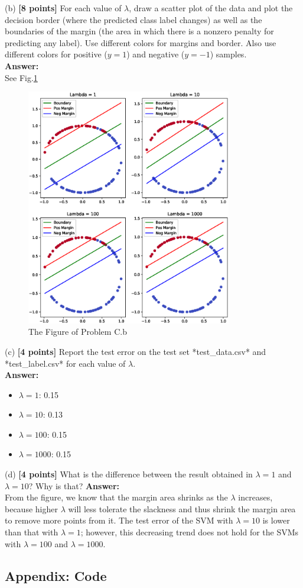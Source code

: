 (b) \textbf{[8 points]} For each value of $\lambda$, draw a scatter plot of the data and plot the decision border  (where
the predicted class label changes) as well as the boundaries of the margin (the area in which
there is a nonzero penalty for predicting any label). Use different colors for margins and border. Also use different colors for positive ($y=1$) and negative ($y=-1$) samples.\\
\textbf{Answer:}\\
See Fig.\ref{fig:svm}
\begin{figure}[!h]
	\centering
	\includegraphics[width=0.8\textwidth]{./img/svm.eps}
	\caption{The Figure of Problem C.b}
	\label{fig:svm}
\end{figure}

(c) \textbf{[4 points]} Report the test error on the test set *test\_data.csv* and *test\_label.csv* for each value of $\lambda$.\\
\textbf{Answer:}\\
\begin{itemize}
	\item $\lambda = 1$: 0.15
	\item $\lambda = 10$: 0.13
	\item $\lambda = 100$: 0.15
	\item $\lambda = 1000$: 0.15
\end{itemize}

(d) \textbf{[4 points]} What is the difference between the result obtained in $\lambda=1$ and $\lambda=10$? Why is that?
\textbf{Answer:}\\
From the figure, we know that the margin area shrinks as the $\lambda$ increases, because higher $\lambda$ will less tolerate the slackness and thus shrink the margin area to remove more points from it. The test error of the SVM with $\lambda=10$ is lower than that with $\lambda=1$; however, this decreasing trend does not hold for the SVMs with $\lambda = 100$ and $\lambda = 1000$.

\newpage

\subsection*{Appendix: Code}


